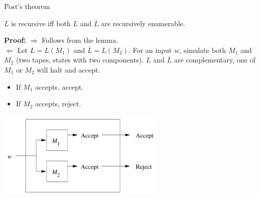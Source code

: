 \documentclass[handout]{beamer}
\begin{document}
\begin{frame}{Post's theorem}

    \begin{theorem}
        $L$ is recursive iff both $L$ and $\overline{L}$ are recursively enumerable.
    \end{theorem}
    \vspace{-6pt}
    \textbf{Proof:} \alert{$\Rightarrow$} Follows from the lemma.
    \\ \alert{$\Leftarrow$} Let $L=L(M_1)$ and $\overline{L}=L(M_2)$. For an input $w$, simulate both $M_1$ and $M_2$ (two tapes, states with two components). $L$ and $\overline{L}$ are complementary, one of $M_1$ or $M_2$ will halt and accept.

    \vspace{-3pt}
    \begin{itemize}
        \item If $M_1$ accepts, accept.
        \item If $M_2$ accepts, reject.\hfill\qedsymbol
    \end{itemize}

    \vspace{-6pt}
    \begin{center}
        \includegraphics[width=0.6\textwidth]{files/bothRE.PNG}
    \end{center}

\end{frame}
\end{document}
